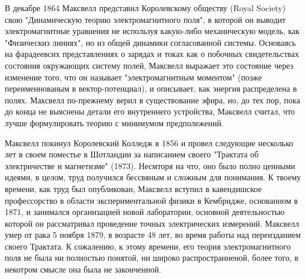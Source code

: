 \documentclass[12pt, oneside, a4paper]{article}
\begin{document}
В декабре 1864 Максвелл представил Королевскому обществу (Royal Society) свою "Динамическую теорию электромагнитного поля", в которой он выводит электромагнитные уравнения не используя какую-либо механическую модель, как "Физическиз линиях", но из общей динамики согласованной системы. Основаясь на фарадеевсих представлениях о зарядах и токах как о побочных свидетельствах состояния окружающих систему полей, Максвелл выражает это состояние через изменение того, что он называет "электромагнитным моментом" (позже переименнованым в вектор-потенциал), и описывает, как энергия распределена в полях. Максвелл по-прежнему верил в существование эфира, но, до тех пор, пока до конца не выяснены детали его внутреннего устройства, Максвелл считал, что лучше формулировать теорию с минимумом предполежений. 

Максвелл покинул Королевский Колледж в 1856 и провел следующие несколько лет в своем поместье в Шотландии за написанием своего "Трактата об электричестве и магнетизме" (1873). Несмторя на что, оно было полно ценными идеями, в целом, труд получился бессвяным и сложным для понимания. К твоему времени, как труд был опубликован, Максвелл вступил в кавендишское профессорство в области экспериментальной физики в Кембридже, основанном в 1871, и занимался организацией новой лаборатории, основной деятельностью которой он рассматривал проведение точных электрических измерений. Максвелл умер от рака 5 ноября 1879, в возрасте 48 лет, во время работы над переизданием своего Трактата. К сожалению, к этому времени, его теория электромагнитного поля не была ни полностью понятой, ни широко распространненой, более того, в некотром смысле она была не законченной.   
\end{document}
